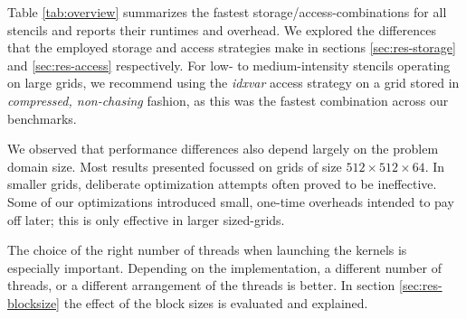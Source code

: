 Table \ref{tab:overview} summarizes the fastest storage/access-combinations for all stencils and reports their runtimes and overhead. We explored the differences that the employed storage and access strategies make in sections \ref{sec:res-storage} and \ref{sec:res-access} respectively. For low- to medium-intensity stencils operating on large grids, we recommend using the \emph{idxvar} access strategy on a grid stored in \emph{compressed, non-chasing} fashion, as this was the fastest combination across our benchmarks. 

We observed that performance differences also depend largely on the problem domain size. Most results presented focussed on grids of size $512\times 512\times 64$. In smaller grids, deliberate optimization attempts often proved to be ineffective. Some of our optimizations introduced small, one-time overheads intended to pay off later; this is only effective in larger sized-grids.

The choice of the right number of threads when launching the kernels is especially important. Depending on the implementation, a different number of threads, or a different arrangement of the threads is better. In section \ref{sec:res-blocksize} the effect of the block sizes is evaluated and explained.